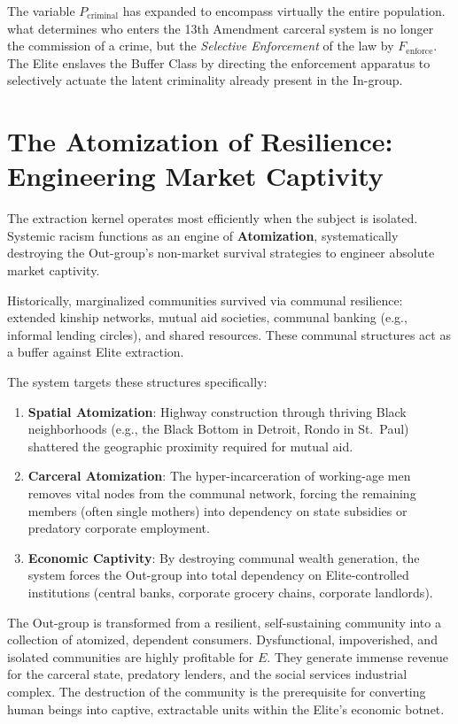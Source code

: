 The variable $P_{\text{criminal}}$ has expanded to encompass virtually the entire population. what determines who enters the 13th Amendment carceral system is no longer the commission of a crime, but the \textit{Selective Enforcement} of the law by $F_{\text{enforce}}$. The Elite enslaves the Buffer Class by directing the enforcement apparatus to selectively actuate the latent criminality already present in the In-group.

\section{The Atomization of Resilience: Engineering Market Captivity}

The extraction kernel operates most efficiently when the subject is isolated. Systemic racism functions as an engine of \textbf{Atomization}, systematically destroying the Out-group's non-market survival strategies to engineer absolute market captivity.

Historically, marginalized communities survived via communal resilience: extended kinship networks, mutual aid societies, communal banking (e.g., informal lending circles), and shared resources. These communal structures act as a buffer against Elite extraction.

The system targets these structures specifically:
\begin{enumerate}
    \item \textbf{Spatial Atomization}: Highway construction through thriving Black neighborhoods (e.g., the Black Bottom in Detroit, Rondo in St.\ Paul) shattered the geographic proximity required for mutual aid.
    \item \textbf{Carceral Atomization}: The hyper-incarceration of working-age men removes vital nodes from the communal network, forcing the remaining members (often single mothers) into dependency on state subsidies or predatory corporate employment.
    \item \textbf{Economic Captivity}: By destroying communal wealth generation, the system forces the Out-group into total dependency on Elite-controlled institutions (central banks, corporate grocery chains, corporate landlords). 
\end{enumerate}

The Out-group is transformed from a resilient, self-sustaining community into a collection of atomized, dependent consumers. Dysfunctional, impoverished, and isolated communities are highly profitable for $E$. They generate immense revenue for the carceral state, predatory lenders, and the social services industrial complex. The destruction of the community is the prerequisite for converting human beings into captive, extractable units within the Elite's economic botnet.

